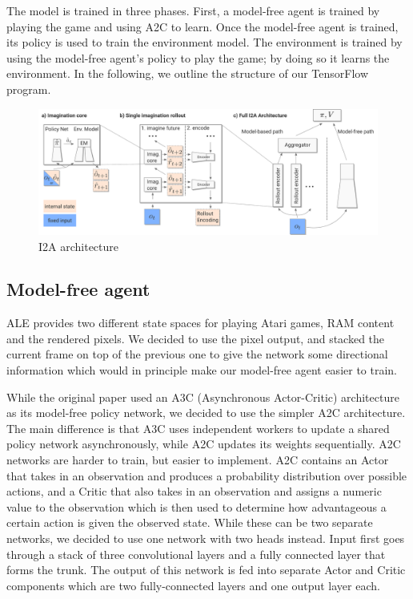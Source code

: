 \documentclass[10pt, twocolumn]{article}
\begin{document}
The model is trained in three phases. First, a model-free agent is trained by playing the game and using
A2C to learn. Once the model-free agent is trained, its policy is used to train the environment model.
The environment is trained by using the model-free agent's policy to play the game; by doing so it learns the
environment. In the following, we outline the structure of our TensorFlow program.

\begin{figure}
\centering
\includegraphics[scale=0.3]{i2a}
\caption{I2A architecture}
\label{I2A}
\end{figure}

\subsection{Model-free agent}
ALE provides two different state spaces for playing Atari games, RAM content and the rendered pixels. We decided to use the pixel output, and stacked the current frame on top of the previous one to give the network some directional information which would in principle make our model-free agent easier to train.

While the original paper used an A3C (Asynchronous Actor-Critic) architecture as its model-free policy network, we decided to use the simpler A2C architecture.
The main difference is that A3C uses independent workers to update a shared policy network asynchronously, while A2C updates its weights sequentially.
A2C networks are harder to train, but easier to implement.
A2C contains an Actor that takes in an observation and produces a probability distribution over possible actions, and a Critic that also takes in an observation and assigns a numeric value to the observation which is then used to determine how advantageous a certain action is given the observed state.
While these can be two separate networks, we decided to use one network with two heads instead.
Input first goes through a stack of three convolutional layers and a fully connected layer that forms the trunk.
The output of this network is fed into separate Actor and Critic components which are two fully-connected layers and one output layer each.
\end{document}

